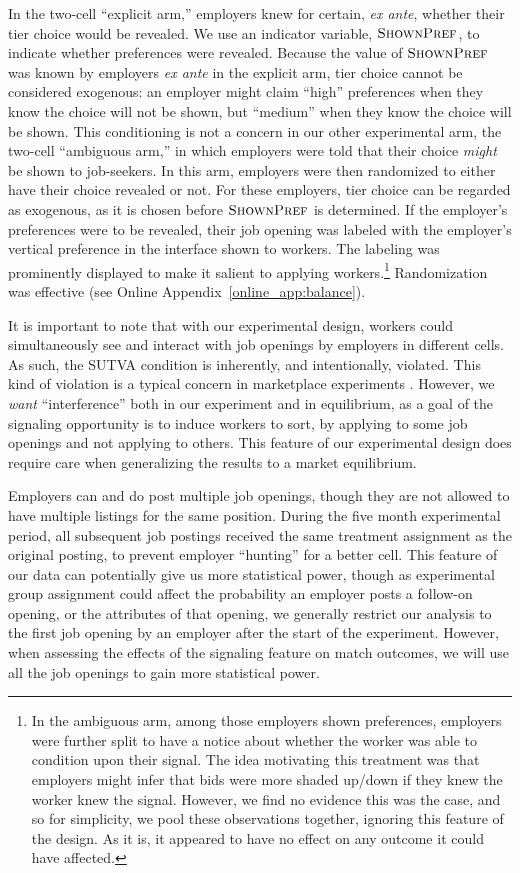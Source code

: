 \documentclass[12pt]{article}
\begin{document}
In the two-cell ``explicit arm,'' employers knew for certain, \emph{ex ante}, whether their tier choice would be revealed.
We use an indicator variable, $\textsc{ShownPref}$, to indicate whether preferences were revealed. 
Because the value of $\textsc{ShownPref}$ was known by employers \emph{ex ante} in the explicit arm, tier choice cannot be considered exogenous: 
an employer might claim ``high'' preferences when they know the choice will not be shown, but ``medium'' when they know the choice will be shown.
This conditioning is not a concern in our other experimental arm, the two-cell  ``ambiguous arm,'' in which employers were told that their choice \emph{might} be shown to job-seekers.
In this arm, employers were then randomized to either have their choice revealed or not. 
For these employers, tier choice can be regarded as exogenous, as it is chosen before $\textsc{ShownPref}$ is determined.
If the employer's preferences were to be revealed, their job opening was labeled with the employer's vertical preference in the interface shown to workers.
The labeling was prominently displayed to make it salient to applying workers.\footnote{
  In the ambiguous arm, among those employers shown preferences, employers were further split to have a notice about whether the worker was able to condition upon their signal.
  The idea motivating this treatment was that employers might infer that bids were more shaded up/down if they knew the worker knew the signal.
  However, we find no evidence this was the case, and so for simplicity, we pool these observations together, ignoring this feature of the design.
  As it is, it appeared to have no effect on any outcome it could have affected. 
}
Randomization was effective (see Online Appendix~\ref{online_app:balance}). 

It is important to note that with our experimental design, workers could simultaneously see and interact with job openings by employers in different cells. 
As such, the SUTVA condition is inherently, and intentionally, violated.
This kind of violation is a typical concern in marketplace experiments \citep{blake2014marketplace}.
However, we \emph{want} ``interference'' both in our experiment and in equilibrium, as a goal of the signaling opportunity is to induce workers to sort, by applying to some job openings and not applying to others.
This feature of our experimental design does require care when generalizing the results to a market equilibrium.

Employers can and do post multiple job openings, though they are not allowed to have multiple listings for the same position. 
During the five month experimental period, all subsequent job postings received the same treatment assignment as the original posting, to prevent employer ``hunting'' for a better cell.
This feature of our data can potentially give us more statistical power, though as experimental group assignment could affect the probability an employer posts a follow-on opening, or the attributes of that opening, we generally restrict our analysis to the first job opening by an employer after the start of the experiment.  
However, when assessing the effects of the signaling feature on match outcomes, we will use all the job openings to gain more statistical power.
\end{document}
